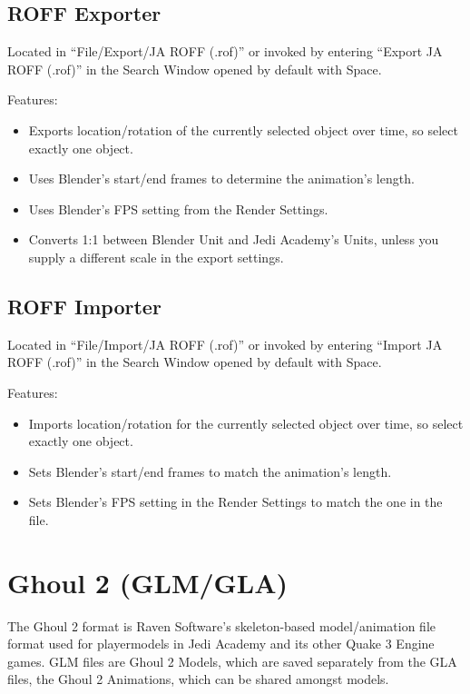 \documentclass[a4paper,10pt]{article}
\begin{document}
 \subsection{ROFF Exporter}
 
 Located in ``File/Export/JA ROFF (.rof)'' or invoked by entering ``Export JA ROFF (.rof)'' in the Search Window
 opened by default with Space.
 
 Features:
 \begin{itemize}
  \item Exports location/rotation of the currently selected object over time, so select exactly one object.
  \item Uses Blender's start/end frames to determine the animation's length.
  \item Uses Blender's FPS setting from the Render Settings.
  \item Converts 1:1 between Blender Unit and Jedi Academy's Units, unless you supply a different scale in
  the export settings.
 \end{itemize}

 \subsection{ROFF Importer}
 
 Located in ``File/Import/JA ROFF (.rof)'' or invoked by entering ``Import JA ROFF (.rof)'' in the Search Window
 opened by default with Space.
 
 Features:
 \begin{itemize}
  \item Imports location/rotation for the currently selected object over time, so select exactly one object.
  \item Sets Blender's start/end frames to match the animation's length.
  \item Sets Blender's FPS setting in the Render Settings to match the one in the file.
 \end{itemize}
 
 
 \section{Ghoul 2 (GLM/GLA)}
 
 The Ghoul 2 format is Raven Software's skeleton-based model/animation file format used for playermodels in
 Jedi Academy and its other Quake 3 Engine games. GLM files are Ghoul 2 Models, which are saved separately from
 the GLA files, the Ghoul 2 Animations, which can be shared amongst models.
 
\end{document}
